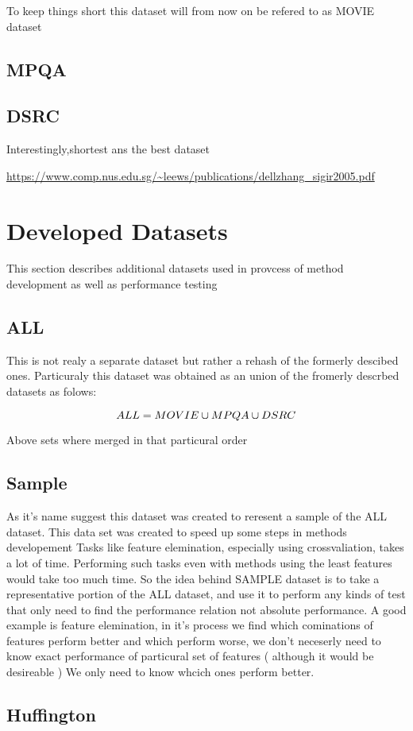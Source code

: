%

To keep things short this dataset will from now on be refered to as MOVIE dataset


\subsection{ MPQA }



\subsection{ DSRC }

Interestingly,shortest ans the best dataset

\url{https://www.comp.nus.edu.sg/~leews/publications/dellzhang_sigir2005.pdf}

\section{ Developed Datasets }

This section describes additional datasets used in provcess of method development as well as performance testing

\subsection{ ALL }

This is not realy a separate dataset but rather a rehash of the formerly descibed ones. 
Particuraly this dataset was obtained as an union of the fromerly descrbed datasets as folows:

\begin{displaymath}
\centering
ALL = MOVIE \cup MPQA \cup DSRC
\end{displaymath}

Above sets where merged in that particural order


\subsection{ Sample }

As it's name suggest this dataset was created to reresent a sample of the ALL dataset. This data set was created to speed up some steps in methods developement
Tasks like feature elemination, especially using crossvaliation, takes a lot of time. Performing such tasks even with methods using the least features would
take too much time. So the idea behind SAMPLE dataset is to take a representative portion of the ALL dataset, and use it to perform any kinds of test that 
only need to find the performance relation not absolute performance. A good example is feature elemination, in it's process we find which cominations of features
perform better and which perform worse, we don't neceserly need to know exact performance of particural set of features ( although it would be desireable ) We only
need to know whcich ones perform better. 



\subsection{ Huffington }